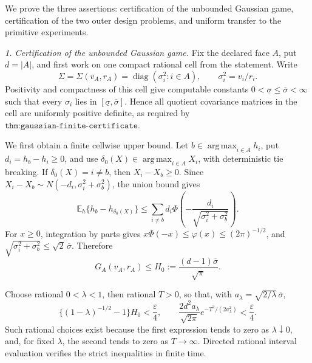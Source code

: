We prove the three assertions: certification of the unbounded Gaussian game, certification of the two outer design problems, and uniform transfer to the primitive experiments.

\emph{1. Certification of the unbounded Gaussian game.}
Fix the declared face \(A\), put \(d=|A|\), and first work on one compact rational cell from the statement.  Write
\[
\Sigma=\Sigma(v_A,r_A)=\operatorname{diag}(\sigma_i^2:i\in A),
\qquad \sigma_i^2=v_i/r_i.
\]
Positivity and compactness of this cell give computable constants \(0<\underline\sigma\leq\overline\sigma<\infty\) such that every \(\sigma_i\) lies in \([\underline\sigma,\overline\sigma]\).  Hence all quotient covariance matrices in the cell are uniformly positive definite, as required by \(\texttt{thm:gaussian-finite-certificate}\).

We first obtain a finite cellwise upper bound.  Let \(b\in\operatorname*{arg\,max}_{i\in A}h_i\), put \(d_i=h_b-h_i\geq0\), and use \(\delta_0(X)\in\operatorname*{arg\,max}_{i\in A}X_i\), with deterministic tie breaking.  If \(\delta_0(X)=i\ne b\), then \(X_i-X_b\geq0\).  Since \(X_i-X_b\sim N(-d_i,\sigma_i^2+\sigma_b^2)\), the union bound gives
\[
\mathbb E_h\{h_b-h_{\delta_0(X)}\}
\leq\sum_{i\ne b}d_i\Phi\!\left(-\frac{d_i}{\sqrt{\sigma_i^2+\sigma_b^2}}\right).       \tag{1}
\]
For \(x\geq0\), integration by parts gives \(x\Phi(-x)\leq\varphi(x)\leq(2\pi)^{-1/2}\), and \(\sqrt{\sigma_i^2+\sigma_b^2}\leq\sqrt2\,\overline\sigma\).  Therefore
\[
G_A(v_A,r_A)\leq H_0:=\frac{(d-1)\overline\sigma}{\sqrt\pi}.       \tag{2}
\]

Choose rational \(0<\lambda<1\), then rational \(T>0\), so that, with \(a_\lambda=\sqrt{2/\lambda}\,\overline\sigma\),
\[
\{(1-\lambda)^{-1/2}-1\}H_0<\frac\varepsilon4,
\qquad
\frac{2d^2a_\lambda}{\sqrt{2\pi}}
e^{-T^2/(2a_\lambda^2)}<\frac\varepsilon4.                        \tag{3}
\]
Such rational choices exist because the first expression tends to zero as \(\lambda\downarrow0\), and, for fixed \(\lambda\), the second tends to zero as \(T\to\infty\).  Directed rational interval evaluation verifies the strict inequalities in finite time.


